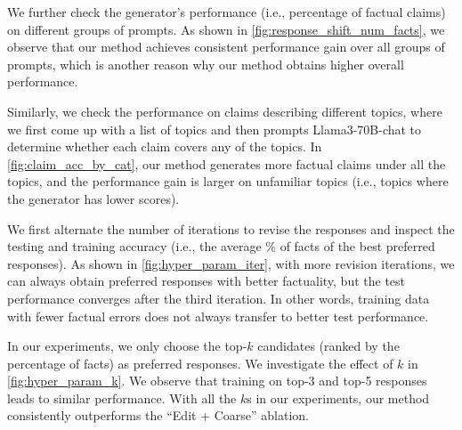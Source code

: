 We further check the generator's performance (i.e., percentage of factual claims) on different groups of prompts. 
As shown in \autoref{fig:response_shift_num_facts}, we observe that our method achieves consistent performance gain over all groups of prompts, which is another reason why our method obtains higher overall performance.

Similarly, we check the performance on claims describing different topics, where we first come up with a list of topics and then prompts Llama3-70B-chat to determine whether each claim covers any of the topics. 
In \autoref{fig:claim_acc_by_cat}, our method generates more factual claims under all the topics, and the performance gain is larger on unfamiliar topics (i.e., topics where the generator has lower scores). 

We first alternate the number of iterations to revise the responses and inspect the testing and training accuracy (i.e., the average \% of facts of the best preferred responses).
As shown in \autoref{fig:hyper_param_iter}, with more revision iterations, we can always obtain preferred responses with better factuality, but the test performance converges after the third iteration. 
In other words, training data with fewer factual errors does not always transfer to better test performance.


In our experiments, we only choose the top-$k$ candidates (ranked by the percentage of facts) as preferred responses. We investigate the effect of $k$ in \autoref{fig:hyper_param_k}. We observe that training on top-3 and top-5 responses leads to similar performance. With all the $k$s in our experiments, our method consistently outperforms the ``Edit + Coarse'' ablation.







